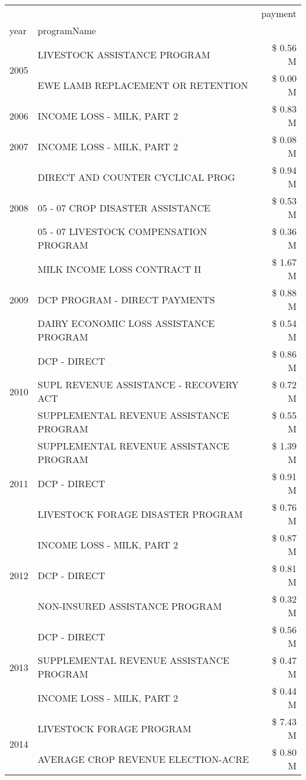 \begin{tabular}{llr}
\toprule
 &  & payment \\
year & programName &  \\
\midrule
\multirow[t]{2}{*}{2005} & LIVESTOCK ASSISTANCE PROGRAM & \$ 0.56 M \\
 & EWE LAMB REPLACEMENT OR RETENTION & \$ 0.00 M \\
\cline{1-3}
2006 & INCOME LOSS - MILK, PART 2 & \$ 0.83 M \\
\cline{1-3}
2007 & INCOME LOSS - MILK, PART 2 & \$ 0.08 M \\
\cline{1-3}
\multirow[t]{3}{*}{2008} & DIRECT AND COUNTER CYCLICAL PROG & \$ 0.94 M \\
 & 05 - 07 CROP DISASTER ASSISTANCE & \$ 0.53 M \\
 & 05 - 07 LIVESTOCK COMPENSATION PROGRAM & \$ 0.36 M \\
\cline{1-3}
\multirow[t]{3}{*}{2009} & MILK INCOME LOSS CONTRACT II & \$ 1.67 M \\
 & DCP PROGRAM - DIRECT PAYMENTS & \$ 0.88 M \\
 & DAIRY ECONOMIC LOSS ASSISTANCE PROGRAM & \$ 0.54 M \\
\cline{1-3}
\multirow[t]{3}{*}{2010} & DCP - DIRECT & \$ 0.86 M \\
 & SUPL REVENUE ASSISTANCE - RECOVERY ACT & \$ 0.72 M \\
 & SUPPLEMENTAL REVENUE ASSISTANCE PROGRAM & \$ 0.55 M \\
\cline{1-3}
\multirow[t]{3}{*}{2011} & SUPPLEMENTAL REVENUE ASSISTANCE PROGRAM & \$ 1.39 M \\
 & DCP - DIRECT & \$ 0.91 M \\
 & LIVESTOCK FORAGE DISASTER PROGRAM & \$ 0.76 M \\
\cline{1-3}
\multirow[t]{3}{*}{2012} & INCOME LOSS - MILK, PART 2 & \$ 0.87 M \\
 & DCP - DIRECT & \$ 0.81 M \\
 & NON-INSURED ASSISTANCE PROGRAM & \$ 0.32 M \\
\cline{1-3}
\multirow[t]{3}{*}{2013} & DCP - DIRECT & \$ 0.56 M \\
 & SUPPLEMENTAL REVENUE ASSISTANCE PROGRAM & \$ 0.47 M \\
 & INCOME LOSS - MILK, PART 2 & \$ 0.44 M \\
\cline{1-3}
\multirow[t]{3}{*}{2014} & LIVESTOCK FORAGE PROGRAM & \$ 7.43 M \\
 & AVERAGE CROP REVENUE ELECTION-ACRE & \$ 0.80 M \\

\end{tabular}
